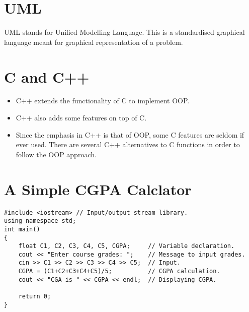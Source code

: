 \documentclass[12pt,a4paper]{article}
\begin{document}
\section{UML}
UML stands for Unified Modelling Language. This is a standardised graphical language meant for graphical representation of a problem.
\section{C and C++}
\begin{itemize}
\item C++ extends the functionality of C to implement OOP.
\item C++ also adds some features on top of C.
\item Since the emphasis in C++ is that of OOP, some C features are seldom if ever used. There are several C++ alternatives to C functions in order to follow the OOP approach.
\end{itemize}
\section{A Simple CGPA Calclator}
\begin{lstlisting}[caption={CGPA Calculator}]
#include <iostream> // Input/output stream library.
using namespace std;
int main()
{
	float C1, C2, C3, C4, C5, CGPA;		// Variable declaration.
	cout << "Enter course grades: ";	// Message to input grades.
	cin >> C1 >> C2 >> C3 >> C4 >> C5;	// Input.
	CGPA = (C1+C2+C3+C4+C5)/5;			// CGPA calculation.
	cout << "CGA is " << CGPA << endl;	// Displaying CGPA.
	
	return 0;
}
\end{lstlisting}
\nocite{*}


\end{document}

